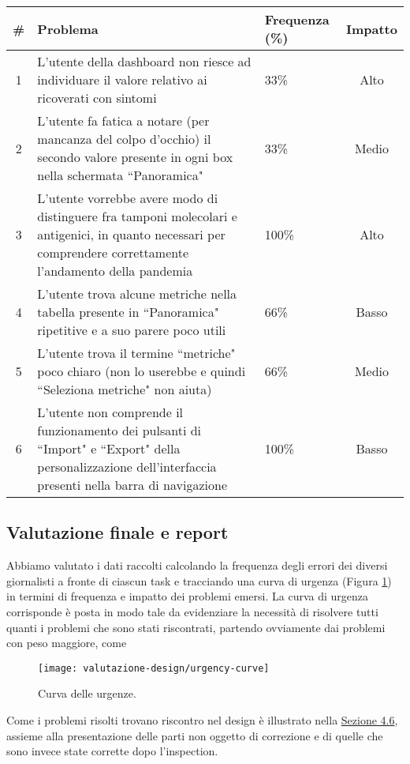{
\renewcommand{\arraystretch}{2}
\begin{longtable}{|c|p{9cm}|p{3cm}|c|}
    \hline
    \textbf{\#} & \textbf{Problema} & \textbf{Frequenza (\%)} & \textbf{Impatto} \\
    \hline
    \endhead
    1 & L'utente della dashboard non riesce ad individuare il valore relativo ai ricoverati con sintomi & 33\% & Alto \\
    \hline
    2 & L'utente fa fatica a notare (per mancanza del colpo d'occhio) il secondo valore presente in ogni box nella schermata ``Panoramica" & 33\% & Medio \\
    \hline
    3 & L'utente vorrebbe avere modo di distinguere fra tamponi molecolari e antigenici, in quanto necessari per comprendere correttamente l'andamento della pandemia & 100\% & Alto \\
    \hline
    4 & L'utente trova alcune metriche nella tabella presente in ``Panoramica" ripetitive e a suo parere poco utili & 66\% & Basso \\
    \hline
    5 & L'utente trova il termine ``metriche" poco chiaro (non lo userebbe e quindi ``Seleziona metriche" non aiuta) & 66\% & Medio \\
    \hline
    6 & L'utente non comprende il funzionamento dei pulsanti di ``Import" e ``Export" della personalizzazione dell'interfaccia presenti nella barra di navigazione & 100\% & Basso \\
    \hline
\end{longtable}
}

\subsection{Valutazione finale e report}
\label{ss:valutazione-finale-report}
Abbiamo valutato i dati raccolti calcolando la frequenza degli errori dei diversi giornalisti a fronte di ciascun task e tracciando una curva di urgenza (Figura \ref{fig:testing-urgency-curve}) in termini di frequenza e impatto dei problemi emersi.
La curva di urgenza corrisponde è posta in modo tale da evidenziare la necessità di risolvere tutti quanti i problemi che sono stati riscontrati, partendo ovviamente dai problemi con peso maggiore, come 

\begin{figure}[H]
    \centering
    \texttt{[image: valutazione-design/urgency-curve]}
    \caption{Curva delle urgenze.}
    \label{fig:testing-urgency-curve}
\end{figure}
\noindent
Come i problemi risolti trovano riscontro nel design è illustrato nella \hyperref[s:wireframe]{Sezione 4.6}, assieme alla presentazione delle parti non oggetto di correzione e di quelle che sono invece state corrette dopo l'inspection.